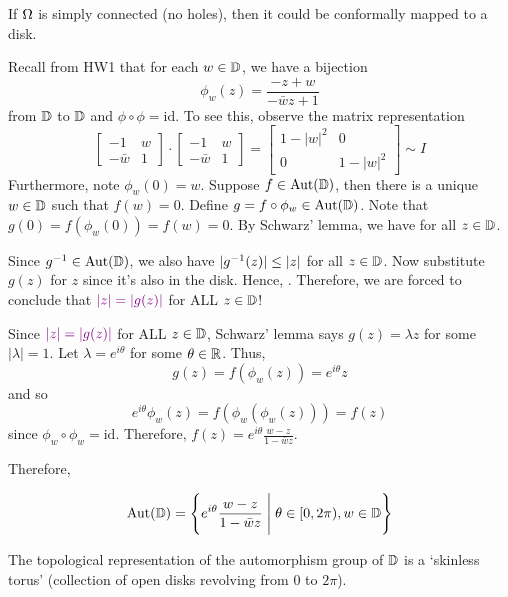 \documentclass[12pt]{article}
\begin{document}
\begin{theorem}
    If $\Omega$ is simply connected (no holes), then it could be conformally mapped to a disk.
\end{theorem}

\spl

Recall from HW1 that for each $w\in \mathbb{D}$, we have a bijection \[\phi_w(z)=\frac{-z+w}{-\bar w z+1}\] from $\mathbb{D}$ to $\mathbb{D}$ and $\phi\circ \phi=\mathrm{id}$. To see this, observe the matrix representation \[\begin{bmatrix}
    -1 & w\\ -\bar w & 1
\end{bmatrix}\cdot \begin{bmatrix}
    -1 & w\\ -\bar w & 1
\end{bmatrix} = \begin{bmatrix}
    1-|w|^2 & 0 \\ 0 &  1-|w|^2
\end{bmatrix}\sim I\]
Furthermore, note $\phi_w(0)=w$. Suppose $f\in \operatorname{Aut}(\mathbb{D})$, then there is a unique $w\in \mathbb{D}$ such that $f(w)=0$. Define $g=f\circ \phi_w\in \operatorname{Aut}(\mathbb{D})$. Note that $g(0)=f(\phi_w(0))=f(w)=0$. By Schwarz' lemma, we have  for all $z\in \mathbb{D}$. 

Since $g^{-1}\in \operatorname{Aut}(\mathbb{D})$, we also have $|g^{-1}(z)|\leq |z|$ for all $z\in \mathbb{D}$. Now substitute $g(z)$ for $z$ since it's also in the disk. Hence, . Therefore, we are forced to conclude that $\textcolor{violet}{|z|=|g(z)|}$ for ALL $z\in \mathbb{D}$!

Since $\textcolor{violet}{|z|=|g(z)|}$ for ALL $z\in \mathbb{D}$, Schwarz' lemma says $g(z)=\lambda z$ for some $|\lambda|=1$. Let $\lambda=e^{i\theta}$ for some $\theta\in \mathbb{R}$. Thus, \[g(z)=f(\phi_w(z))=e^{i\theta}z\]
and so \[e^{i\theta}\phi_w(z)=f(\phi_w(\phi_w(z)))=f(z)\]
since $\phi_w\circ \phi_w=\mathrm{id}$. Therefore, $\displaystyle f(z)=e^{i\theta}\frac{w-z}{1-\bar wz}$.

Therefore, 
\begin{proposition}
    \[\operatorname{Aut} (\mathbb{D})= \left\{e^{i\theta}\frac{w-z}{1-\bar wz}\; \Bigg \vert\; \theta\in [0,2\pi), w\in \mathbb{D}\right\}\]
\end{proposition}

\rmk The topological representation of the automorphism group of $\mathbb{D}$ is a `skinless torus' (collection of open disks revolving from 0 to $2\pi$).
\end{document}
